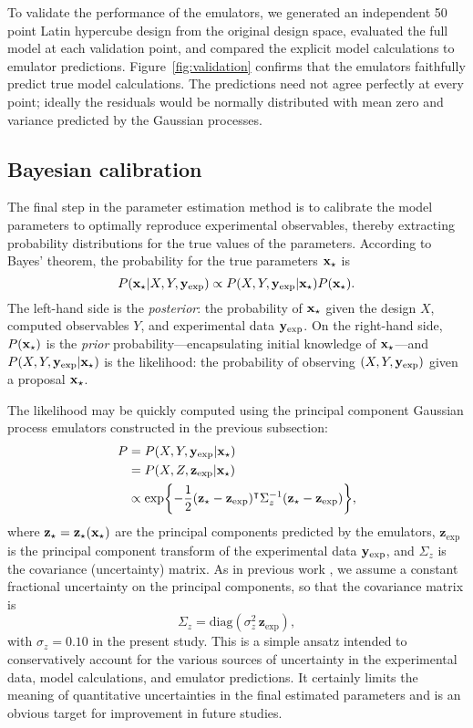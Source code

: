 \documentclass[aps,prc,reprint,amsmath,nofootinbib,superscriptaddress]{revtex4-1}
\begin{document}
To validate the performance of the emulators, we generated an independent 50 point Latin hypercube design from the original design space, evaluated the full model at each validation point, and compared the explicit model calculations to emulator predictions.
Figure~\ref{fig:validation} confirms that the emulators faithfully predict true model calculations.
The predictions need not agree perfectly at every point; ideally the residuals would be normally distributed with mean zero and variance predicted by the Gaussian processes.

\subsection{Bayesian calibration}

\newcommand{\z}{\mathbf z}
\newcommand{\st}{_\star}
\newcommand{\ex}{_\text{exp}}

The final step in the parameter estimation method is to calibrate the model parameters to optimally reproduce experimental observables, thereby extracting probability distributions for the true values of the parameters.
According to Bayes' theorem, the probability for the true parameters $\x\st$ is
\begin{equation}
  P(\x\st|X,Y,\y\ex) \propto P(X,Y,\y\ex|\x\st) P(\x\st).
  \label{eq:bayes}
\end{equation}
The left-hand side is the \emph{posterior}: the probability of $\x\st$ given the design $X$, computed observables $Y$, and experimental data $\y\ex$.
On the right-hand side, $P(\x\st)$ is the \emph{prior} probability---encapsulating initial knowledge of $\x\st$---and $P(X,Y,\y\ex|\x\st)$ is the likelihood: the probability of observing $(X, Y, \y\ex)$ given a proposal $\x\st$.

The likelihood may be quickly computed using the principal component Gaussian process emulators constructed in the previous subsection:
\begin{align}
  P &= P(X,Y,\y\ex|\x\st) \nonumber \\
    &= P(X,Z,\z\ex|\x\st) \nonumber \\
    &\propto\exp\biggl\{
      -\frac{1}{2} (\z\st - \z\ex)\tran \Sigma_z^{-1} (\z\st - \z\ex)
    \biggr\},
  \label{eq:likelihood}
\end{align}
where $\z\st = \z\st(\x\st)$ are the principal components predicted by the emulators, $\z\ex$ is the principal component transform of the experimental data $\y\ex$, and $\Sigma_z$ is the covariance (uncertainty) matrix.
As in previous work \cite{Novak:2013bqa,Bernhard:2015hxa}, we assume a constant fractional uncertainty on the principal components, so that the covariance matrix is
\begin{equation}
  \Sigma_z = \text{diag}(\sigma^2_z\,\z\ex),
  \label{eq:uncertainty}
\end{equation}
with $\sigma_z = 0.10$ in the present study.
This is a simple ansatz intended to conservatively account for the various sources of uncertainty in the experimental data, model calculations, and emulator predictions.
It certainly limits the meaning of quantitative uncertainties in the final estimated parameters and is an obvious target for improvement in future studies.
\end{document}
